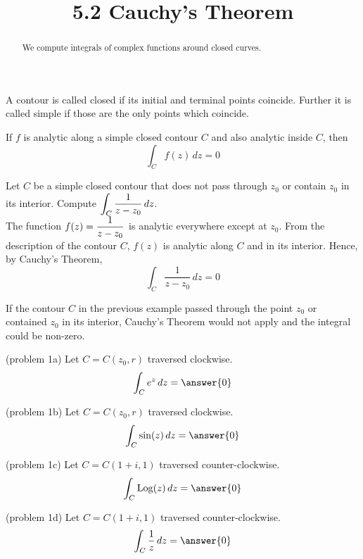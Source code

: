 \documentclass[handout]{ximera}
\title{5.2 Cauchy's Theorem}
\begin{document}
\begin{abstract}
We compute integrals of complex functions around closed curves.
\end{abstract}

\maketitle

A contour is called closed if its initial and terminal points coincide.  Further it is called simple if those are the only points which coincide. 
\begin{theorem}
If $f$ is analytic along a simple closed contour $C$ and also analytic inside $C$, then
\[
\int_C f(z) \, dz = 0
\]
\end{theorem}

\begin{example}
Let $C$ be a simple closed contour that does not pass through $z_0$ or contain $z_0$ in its interior. Compute $\displaystyle \int_C \frac{1}{z-z_0} \, dz$.\\
The function $\displaystyle f(z) = \frac{1}{z-z_0}$ is analytic everywhere except at $z_0$.  From the description of the contour $C$,
$f(z)$ is analytic along $C$ and in its interior.  Hence, by Cauchy's Theorem,
\[
\int_C \frac{1}{z-z_0} \, dz = 0
\]
\end{example}
\begin{remark}
If the contour $C$ in the previous example passed through the point $z_0$ or contained $z_0$ in its interior, Cauchy's Theorem would not apply
and the integral could be non-zero.
\end{remark}

\begin{problem}(problem 1a)
Let $C = C(z_0, r)$ traversed clockwise.\\
\[
\int_C e^z \, dz = \answer{0}
\]
\end{problem}

\begin{problem}(problem 1b)
Let $C = C(z_0, r)$ traversed clockwise.\\
\[
\int_C \sin(z) \, dz = \answer{0}
\]
\end{problem}

\begin{problem}(problem 1c)
Let $C = C(1+i, 1)$ traversed counter-clockwise.\\
\[
\int_C \Log(z) \, dz = \answer{0}
\]
\end{problem}

\begin{problem}(problem 1d)
Let $C = C(1+i, 1)$ traversed counter-clockwise.\\
\[
\int_C \frac{1}{z} \, dz = \answer{0}
\]
\end{problem}
\end{document}
